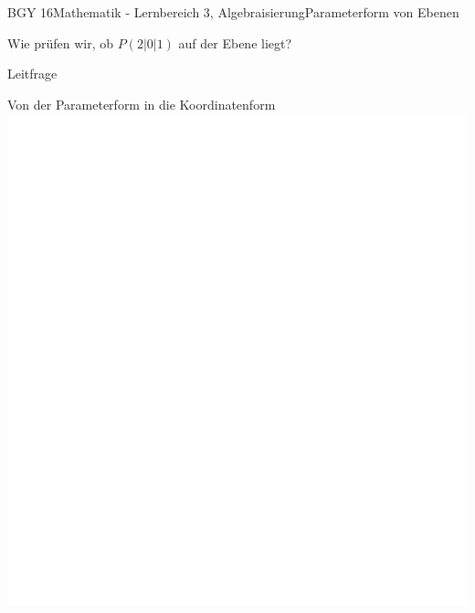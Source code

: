 \documentclass[oneside,openany,headings=optiontotoc,11pt,numbers=noenddot]{scrreprt}
\begin{document}
\begin{worksheet}{BGY 16}{Mathematik - Lernbereich 3, Algebraisierung}{Parameterform von Ebenen}
\begin{framed}
			Wie prüfen wir, ob \(P(2|0|1)\) auf der Ebene liegt?
		\end{framed}
		\begin{framed}
			\noindent
			\tiny{\color{codegray}Leitfrage}\\
			\par\bigskip\noindent
		\end{framed}
		\begin{framed}
			\noindent
			\tiny{\color{codegray}Von der Parameterform in die Koordinatenform}\\
			\includegraphics[scale=0.45]{../empty.jpg}
		\end{framed}
		\begin{framed}

\end{framed}
\end{worksheet}
\end{document}

